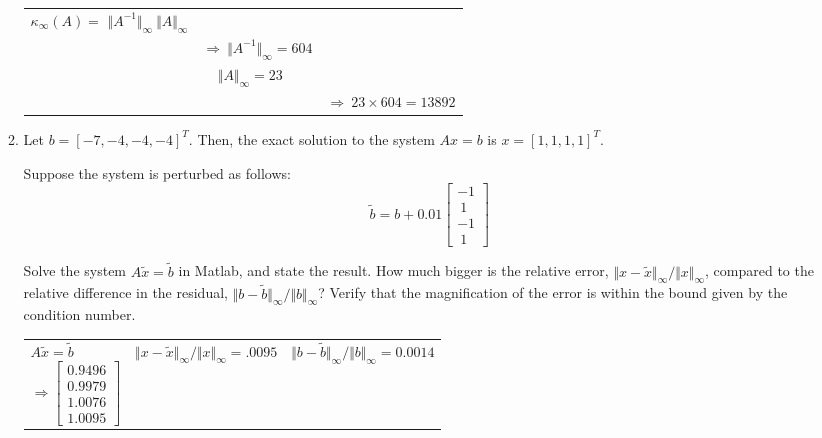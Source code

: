 \documentclass{article}
\begin{document}
\begin{enumerate}
\begin{enumerate}
\begin{mdframed}[style=MyFrame]
\begin{tabular}{l l l}
$\displaystyle \kappa_{\infty} (A) = $ $ \Vert A^{-1} \Vert_{\infty} ~ \Vert A \Vert_{\infty} $\\
& $\Rightarrow ~ \Vert A^{-1} \Vert_{\infty} =604$ \\
& $~~~~~\Vert A \Vert_{\infty}=23 $ \\
& & $ \Rightarrow ~ 23\times604=13892 $
\end{tabular}
\end{mdframed}

\newpage
\item Let  $b = [-7,-4,-4,-4]^T$.  Then, the exact solution to the system $Ax=b$ is $x=[1,1,1,1]^T$. 

Suppose the system is perturbed as follows:
\begin{equation*}
\tilde{b} = b + 0.01 \begin{bmatrix} -1\\~1\\-1\\~1 \end{bmatrix}
\end{equation*}

Solve the system $A \tilde{x} = \tilde{b}$ in Matlab, and state the result. How much bigger is the relative error, $\Vert x-\tilde x \Vert_{\infty} / \Vert x \Vert_{\infty}$, compared to the relative difference in the residual, $\displaystyle \Vert b - \tilde{b} \Vert_{\infty}/\Vert b \Vert_{\infty}$? Verify that the magnification of the error is within the bound given by the condition number.
\begin{mdframed}[style=MyFrame]
\begin{tabular}{p{3cm} | p{4.5cm} | p{4.5cm}}
$A \tilde{x} = \tilde{b}$
\begin{equation*}
\Rightarrow\begin{bmatrix}
    0.9496\\
    0.9979\\
    1.0076\\
    1.0095
\end{bmatrix}
\end{equation*}

&

$\Vert x-\tilde x \Vert_{\infty} / \Vert x \Vert_{\infty}=.0095$
&

$\displaystyle \Vert b - \tilde{b} \Vert_{\infty}/\Vert b \Vert_{\infty} = 0.0014$
    
\end{tabular}
\end{mdframed}


\end{enumerate}
\end{enumerate}
\end{document}
